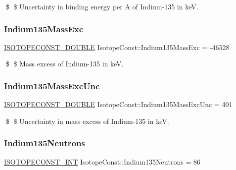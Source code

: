 \$ \$ Uncertainty in binding energy per A of Indium-\/135 in keV. \mbox{\label{group___isotope_const-_indium-_in135_ga4be78e6fc43964e51065d8bc7bdd3564}} 
\subsubsection{\texorpdfstring{Indium135\+Mass\+Exc}{Indium135MassExc}}
{\footnotesize\ttfamily \mbox{\hyperlink{group___isotope_const-_macros_ga8f45a7272ce02c0b4c65c44636ed719a}{I\+S\+O\+T\+O\+P\+E\+C\+O\+N\+S\+T\+\_\+\+D\+O\+U\+B\+LE}} Isotope\+Const\+::\+Indium135\+Mass\+Exc = -\/46528}

\$ \$ Mass excess of Indium-\/135 in keV. \mbox{\label{group___isotope_const-_indium-_in135_ga1027198b78c54147fa7988849087d349}} 
\subsubsection{\texorpdfstring{Indium135\+Mass\+Exc\+Unc}{Indium135MassExcUnc}}
{\footnotesize\ttfamily \mbox{\hyperlink{group___isotope_const-_macros_ga8f45a7272ce02c0b4c65c44636ed719a}{I\+S\+O\+T\+O\+P\+E\+C\+O\+N\+S\+T\+\_\+\+D\+O\+U\+B\+LE}} Isotope\+Const\+::\+Indium135\+Mass\+Exc\+Unc = 401}

\$ \$ Uncertainty in mass excess of Indium-\/135 in keV. \mbox{\label{group___isotope_const-_indium-_in135_gac9f3b7012f0cfccda935f02a8298a98d}} 
\subsubsection{\texorpdfstring{Indium135\+Neutrons}{Indium135Neutrons}}
{\footnotesize\ttfamily \mbox{\hyperlink{group___isotope_const-_macros_ga5f18360b3e99483a35c32d789e62621c}{I\+S\+O\+T\+O\+P\+E\+C\+O\+N\+S\+T\+\_\+\+I\+NT}} Isotope\+Const\+::\+Indium135\+Neutrons = 86}

